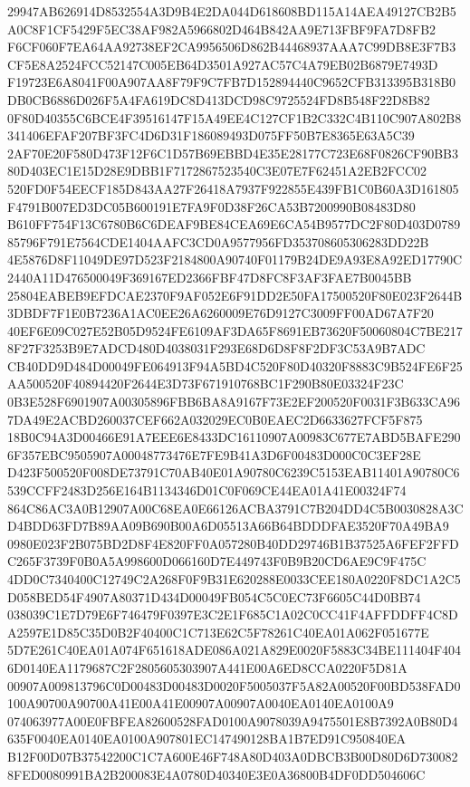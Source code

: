 \documentclass[UTF8,fontset=fandol,zihao=-4,a4paper]{ctexart}
\begin{document}
{{29947AB626914D8532554A3D9B4E2DA044D618608BD115A14AEA49127CB2B5A0C8F1CF5429F5EC38AF982A5966802D464B842AA9E713FBF9FA7D8FB2
F6CF060F7EA64AA92738EF2CA9956506D862B44468937AAA7C99DB8E3F7B3CF5E8A2524FCC52147C005EB64D3501A927AC57C4A79EB02B6879E7493D
F19723E6A8041F00A907AA8F79F9C7FB7D152894440C9652CFB313395B318B0DB0CB6886D026F5A4FA619DC8D413DCD98C9725524FD8B548F22D8B82
0F80D40355C6BCE4F39516147F15A49EE4C127CF1B2C332C4B110C907A802B8341406EFAF207BF3FC4D6D31F186089493D075FF50B7E8365E63A5C39
2AF70E20F580D473F12F6C1D57B69EBBD4E35E28177C723E68F0826CF90BB380D403EC1E15D28E9DBB1F7172867523540C3E07E7F62451A2EB2FCC02
520FD0F54EECF185D843AA27F26418A7937F922855E439FB1C0B60A3D161805F4791B007ED3DC05B600191E7FA9F0D38F26CA53B7200990B08483D80
B610FF754F13C6780B6C6DEAF9BE84CEA69E6CA54B9577DC2F80D403D078985796F791E7564CDE1404AAFC3CD0A9577956FD353708605306283DD22B
4E5876D8F11049DE97D523F2184800A90740F01179B24DE9A93E8A92ED17790C2440A11D476500049F369167ED2366FBF47D8FC8F3AF3FAE7B0045BB
25804EABEB9EFDCAE2370F9AF052E6F91DD2E50FA17500520F80E023F2644B3DBDF7F1E0B7236A1AC0EE26A6260009E76D9127C3009FF00AD67A7F20
40EF6E09C027E52B05D9524FE6109AF3DA65F8691EB73620F50060804C7BE2178F27F3253B9E7ADCD480D4038031F293E68D6D8F8F2DF3C53A9B7ADC
CB40DD9D484D00049FE064913F94A5BD4C520F80D40320F8883C9B524FE6F25AA500520F40894420F2644E3D73F671910768BC1F290B80E03324F23C
0B3E528F6901907A00305896FBB6BA8A9167F73E2EF200520F0031F3B633CA967DA49E2ACBD260037CEF662A032029EC0B0EAEC2D6633627FCF5F875
18B0C94A3D00466E91A7EEE6E8433DC16110907A00983C677E7ABD5BAFE2906F357EBC9505907A00048773476E7FE9B41A3D6F00483D000C0C3EF28E
D423F500520F008DE73791C70AB40E01A90780C6239C5153EAB11401A90780C6539CCFF2483D256E164B1134346D01C0F069CE44EA01A41E00324F74
864C86AC3A0B12907A00C68EA0E66126ACBA3791C7B204DD4C5B0030828A3CD4BDD63FD7B89AA09B690B00A6D05513A66B64BDDDFAE3520F70A49BA9
0980E023F2B075BD2D8F4E820FF0A057280B40DD29746B1B37525A6FEF2FFDC265F3739F0B0A5A998600D066160D7E449743F0B9B20CD6AE9C9F475C
4DD0C7340400C12749C2A268F0F9B31E620288E0033CEE180A0220F8DC1A2C5D058BED54F4907A80371D434D00049FB054C5C0EC73F6605C44D0BB74
038039C1E7D79E6F746479F0397E3C2E1F685C1A02C0CC41F4AFFDDFF4C8DA2597E1D85C35D0B2F40400C1C713E62C5F78261C40EA01A062F051677E
5D7E261C40EA01A074F651618ADE086A021A829E0020F5883C34BE111404F4046D0140EA1179687C2F2805605303907A441E00A6ED8CCA0220F5D81A
00907A009813796C0D00483D00483D0020F5005037F5A82A00520F00BD538FAD0100A90700A90700A41E00A41E00907A00907A0040EA0140EA0100A9
074063977A00E0FBFEA82600528FAD0100A9078039A9475501E8B7392A0B80D4635F0040EA0140EA0100A907801EC147490128BA1B7ED91C950840EA
B12F00D07B37542200C1C7A600E46F748A80D403A0DBCB3B00D80D6D7300828FED0080991BA2B200083E4A0780D40340E3E0A36800B4DF0DD504606C
}}
\end{document}
